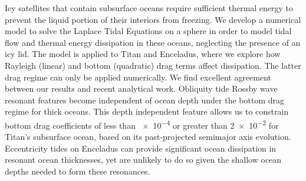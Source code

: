 Icy satellites that contain subsurface oceans require sufficient thermal energy to prevent the liquid portion of their interiors from freezing. We develop a numerical model to solve the Laplace Tidal Equations on a sphere in order to model tidal flow and thermal energy dissipation in these oceans, neglecting the presence of an icy lid. The model is applied to Titan and Enceladus, where we explore how Rayleigh (linear) and bottom (quadratic) drag terms affect dissipation. The latter drag regime can only be applied numerically. We find excellent agreement between our results and recent analytical work. Obliquity tide Rossby wave resonant features become independent of ocean depth under the bottom drag regime for thick oceans. This depth independent feature allows us to constrain bottom drag coefficients of less than \num{e-4} or greater than \num{2e-2} for Titan's subsurface ocean, based on its past-projected semimajor axis evolution. Eccentricity tides on Enceladus can provide significant ocean dissipation in resonant ocean thicknesses, yet are unlikely to do so given the shallow ocean depths needed to form these resonances.
